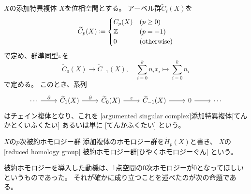 \documentclass[report]{jlreq}
\begin{document}
\begin{definition}[添加複体]
        {$X$の添加特異複体}
    $X$を位相空間とする。
    アーベル群$\widetilde{C}_i(X)$を
    \begin{equation}
        \widetilde{C}_p(X) \coloneqq \begin{cases}
            C_p(X) & (p \ge 0) \\
            \mathbb{Z} & (p = -1) \\
            0 & (\text{otherwise})
        \end{cases}
    \end{equation}
    で定め、群準同型$\varepsilon$を
    \begin{equation}
         \widetilde{C}_0(X) \to \widetilde{C}_{-1}(X),
         \quad
         \sum_{i = 0}^k n_i x_i
         \mapsto
         \sum_{i = 0}^k n_i
    \end{equation}
    で定める。
    このとき、系列
    \begin{equation}
        \begin{tikzcd}
            \cdots \ar{r}{\del}
                & \widetilde{C}_1(X) \ar{r}{\del}
                & \widetilde{C}_0(X) \ar{r}{\eps}
                & \widetilde{C}_{-1}(X) \ar{r}
                & 0 \ar{r}
                & \cdots
        \end{tikzcd}
    \end{equation}
    はチェイン複体となり、これを
    [argumented singular complex]{添加特異複体}[てんかとくいふくたい]
    あるいは単に
    [てんかふくたい]
    という。
\end{definition}

\begin{definition}[被約ホモロジー]
        {$X$の$p$次被約ホモロジー群}
    添加複体のホモロジー群を$\widetilde{H}_p(X)$と書き、
    $X$の[reduced homology group]
    {被約ホモロジー群}[ひやくホモロジーぐん]
    という。
\end{definition}

被約ホモロジーを導入した動機は、1点空間の0次ホモロジーが$0$となってほしいというものであった。
それが確かに成り立つことを述べたのが次の命題である。
\end{document}
